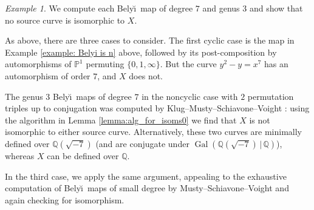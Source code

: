 \documentclass{amsproc}
\numberwithin{equation}{section}
\numberwithin{figure}{section}
\theoremstyle{definition}
\theoremstyle{remark}
\newtheorem{example}[equation]{Example}
\DeclareMathOperator{\Gal}{Gal}
\newcommand{\Q}{\QQ}
\newcommand\PP{\mathbb{P}}
\newcommand\QQ{\mathbb{Q}}
\newcommand{\Belyi}{Bely\u{\i}}
\begin{document}
\begin{example}
We compute each \Belyi\ map of degree $7$ and genus $3$ and show that no source curve is isomorphic to $X$.  

As above, there are three cases to consider.  The first cyclic case is the map in Example \ref{example: Belyi is n} above, followed by its post-composition by automorphisms of $\PP^1$ permuting $\{0,1,\infty\}$.  But the curve $y^2-y=x^7$ has an automorphism of order $7$, and $X$ does not.  

The genus $3$ \Belyi\ maps of degree $7$ in the noncyclic case with $2$ permutation triples up to conjugation was computed by Klug--Musty--Schiavone--Voight \cite[Example 5.27]{KMSV}: using the algorithm in Lemma \ref{lemma:alg_for_isoms0} we find that $X$ is not   isomorphic to either source curve.  Alternatively, these two curves are minimally defined over $\Q(\sqrt{-7})$ (and are conjugate under $\Gal(\Q(\sqrt{-7})\,|\,\Q)$), whereas $X$ can be defined over $\Q$.  

In the third case, we apply the same argument, appealing to the exhaustive computation of \Belyi\ maps of small degree by Musty--Schiavone--Voight \cite{MSVpreprint} and again checking for isomorphism.
\end{example}

{}

\end{document}
